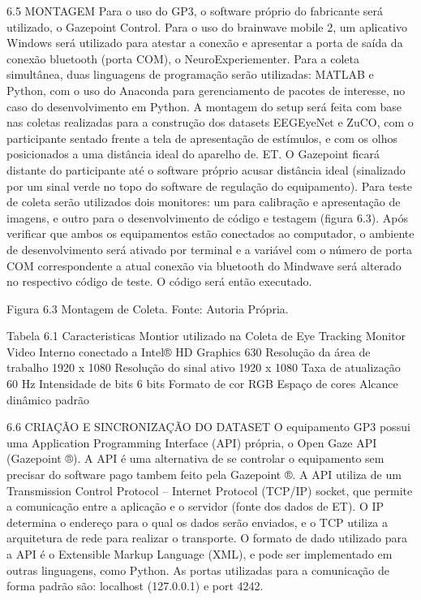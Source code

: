 6.5 MONTAGEM 
Para o uso do GP3, o software próprio do fabricante será utilizado, o Gazepoint Control. Para o uso do brainwave mobile 2, um aplicativo Windows será utilizado para atestar a conexão e apresentar a porta de saída da conexão bluetooth (porta COM), o NeuroExperiementer. Para a coleta simultânea, duas linguagens de programação serão utilizadas: MATLAB e Python, com o uso do Anaconda para gerenciamento de pacotes de interesse, no caso do desenvolvimento em Python. 
 A montagem do setup será feita com base nas coletas realizadas para a construção dos datasets EEGEyeNet e ZuCO, com o participante sentado frente a tela de apresentação de estímulos, e com os olhos posicionados a uma distância ideal do aparelho de. ET. O Gazepoint ficará distante do participante até o software próprio acusar distância ideal (sinalizado por um sinal verde no topo do software de regulação do equipamento). Para teste de coleta serão utilizados dois monitores: um para calibração e apresentação de imagens, e outro para o desenvolvimento de código e testagem (figura 6.3). Após verificar que ambos os equipamentos estão conectados ao computador, o ambiente de desenvolvimento será ativado por terminal e a variável com o número de porta COM correspondente a atual conexão via bluetooth do Mindwave será alterado no respectivo código de teste. O código será então executado.
 
Figura 6.3 Montagem de Coleta. Fonte: Autoria Própria.





Tabela 6.1 Caracteristicas Montior utilizado na Coleta de Eye Tracking 
Monitor	Video Interno conectado a Intel® HD Graphics 630
Resolução da área de trabalho	1920  x 1080
Resolução do sinal ativo	1920  x 1080
Taxa de atualização	60 Hz
Intensidade de bits	6 bits
Formato de cor 	RGB
Espaço de cores	Alcance dinâmico padrão

6.6 CRIAÇÃO E SINCRONIZAÇÃO DO DATASET
O equipamento GP3 possui uma Application Programming Interface (API) própria, o Open Gaze API (Gazepoint ®). A API é uma alternativa de se controlar o equipamento sem precisar do software pago tambem feito pela Gazepoint ®. A API utiliza de um Transmission Control Protocol – Internet Protocol (TCP/IP) socket, que permite a comunicação entre a aplicação e o servidor (fonte dos dados de ET). O IP determina o endereço para o qual os dados serão enviados, e o TCP utiliza a arquitetura de rede para realizar o transporte. O formato de dado utilizado para a API é o Extensible Markup Language (XML), e pode ser implementado em outras linguagens, como Python. As portas utilizadas para a comunicação de forma padrão são: localhost (127.0.0.1) e port 4242. 

